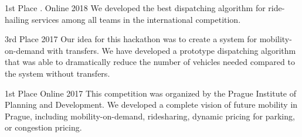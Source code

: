 

\begin{cventries}

  \cventry
    {1st Place} %
    {. } %
    {Online} %
    {2018} %
    {We developed the best dispatching algorithm for ride-hailing services among all teams in the international competition.}
    
    

  \cventry
    {3rd Place} %
    {} %
    {} %
    {2017} %
    {Our idea for this hackathon was to create a system for mobility-on-demand with transfers. We have developed a prototype dispatching algorithm that was able to dramatically reduce the number of vehicles needed compared to the system without transfers.}

  \cventry
    {1st Place} %
    {} %
    {Online} %
    {2017} %
    {This competition was organized by the Prague Institute of Planning and Development. We developed a complete vision of future mobility in Prague, including mobility-on-demand, ridesharing, dynamic pricing for parking, or congestion pricing.}


\end{cventries}